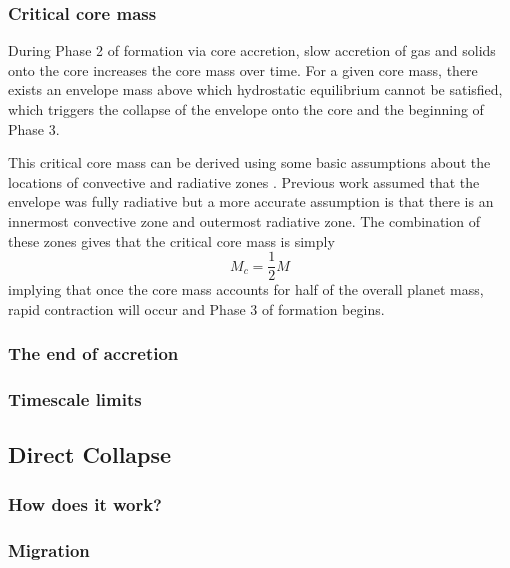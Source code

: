 \documentclass[twocolumn]{aastex631}
\begin{document}
\subsubsection{Critical core mass}

During Phase 2 of formation via core accretion, slow accretion of gas and solids onto the core increases the core mass over time. For a given core mass, there exists an envelope mass above which hydrostatic equilibrium cannot be satisfied, which triggers the collapse of the envelope onto the core and the beginning of Phase 3.

This critical core mass can be derived using some basic assumptions about the locations of convective and radiative zones \citep{Stevenson+1982,Lissauer+2009}. Previous work assumed that the envelope was fully radiative but a more accurate assumption is that there is an innermost convective zone and outermost radiative zone. The combination of these zones gives that the critical core mass is simply
\begin{equation}
    M_{c} = \frac{1}{2} M
\end{equation}
implying that once the core mass accounts for half of the overall planet mass, rapid contraction will occur and Phase 3 of formation begins.

\subsubsection{The end of accretion}

\subsubsection{Timescale limits}

\subsection{Direct Collapse}

\subsubsection{How does it work?}

\subsubsection{Migration}
\end{document}
